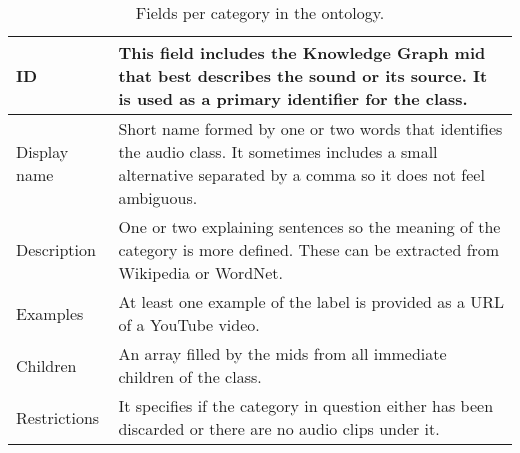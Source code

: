 
\begin{table}[h!]
\begin{center}
	\begin{tabular}{|| m{7em} | m{22em} ||}
		\hline
		ID & This field includes the Knowledge Graph \acrfull{mid} that best describes the sound or its source. It is used as a primary identifier for the class. \\
		\hline
		Display name & Short name formed by one or two words that identifies the audio class. It sometimes includes a small alternative separated by a comma so it does not feel ambiguous. \\
		\hline
		Description & One or two explaining sentences so the meaning of the category is more defined. These can be extracted from Wikipedia or WordNet. \\
		\hline
		Examples & At least one example of the label is provided as a URL of a YouTube video. \\
		\hline
		Children & An array filled by the \acrfull{mid}s from all immediate children of the class. \\
		\hline
		Restrictions & It specifies if the category in question either has been discarded or there are no audio clips under it. \\
		\hline
	\end{tabular}
\end{center}
\caption{Fields per category in the ontology.}
\label{table:2}
\end{table}